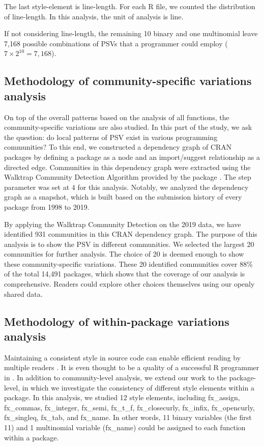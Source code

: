 The last style-element is line-length. For each R file, we counted the distribution of line-length. In this analysis, the unit of analysis is line.

If not considering line-length, the remaining 10 binary and one multinomial leave 7,168 possible combinations of PSVs that a programmer could employ ($7 \times 2^{10} = 7,168$).

\subsection{Methodology of community-specific variations analysis}

On top of the overall patterns based on the analysis of all functions, the community-specific variations are also studied. In this part of the study, we ask the question: do local patterns of PSV exist in various programming communities? To this end, we constructed a dependency graph of CRAN packages by defining a package as a node and an import/suggest relationship as a directed edge. Communities in this dependency graph were extracted using the Walktrap Community Detection Algorithm \citep{pons} provided by the  package \citep{csardi}. The step parameter was set at 4 for this analysis. Notably, we analyzed the dependency graph as a snapshot, which is built based on the submission history of every package from 1998 to 2019. 

By applying the Walktrap Community Detection on the 2019 data, we have identified 931 communities in this CRAN dependency graph. The purpose of this analysis is to show the PSV in different communities. We selected the largest 20 communities for further analysis. The choice of 20 is deemed enough to show these community-specific variations. These 20 identified communities cover 88\% of the total 14,491 packages, which shows that the coverage of our analysis is comprehensive. Readers could explore other choices themselves using our openly shared data.

\subsection{Methodology of within-package variations analysis}

Maintaining a consistent style in source code can enable efficient reading by multiple readers \citep{gillespie2016efficient}. It is even thought to be a quality of a successful R programmer in \citet{gillespie2016efficient}. In addition to community-level analysis, we extend our work to the package-level, in which we investigate the consistency of different style elements within a package. In this analysis, we studied 12 style elements, including fx\_assign, fx\_commas, fx\_integer, fx\_semi, fx\_t\_f, fx\_closecurly, fx\_infix, fx\_opencurly, fx\_singleq, fx\_tab, and fx\_name.  In other words, 11 binary variables (the first 11) and 1 multinomial variable (fx\_name) could be assigned to each function within a package.

